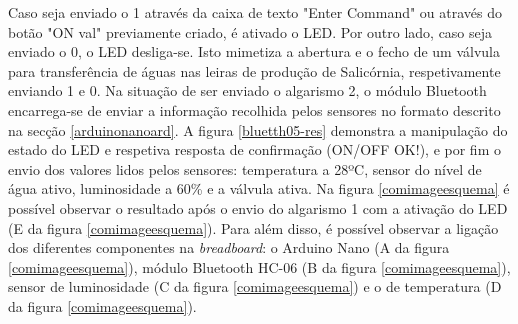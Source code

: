 Caso seja enviado o 1 através da caixa de texto "Enter Command" ou através do botão "ON val" previamente criado, é ativado o LED. Por outro lado, caso seja enviado o 0,  o LED desliga-se. Isto mimetiza a abertura e o fecho de um válvula para transferência de águas nas leiras de produção de Salicórnia, respetivamente enviando 1 e 0. Na situação de ser enviado o algarismo 2, o módulo Bluetooth encarrega-se de enviar a informação recolhida pelos sensores no formato descrito na secção \ref{arduinonanoard}. A figura \ref{bluetth05-res} demonstra a manipulação do estado do LED e respetiva resposta de confirmação (ON/OFF OK!), e por fim o envio dos valores lidos pelos sensores: temperatura a 28ºC, sensor do nível de água ativo, luminosidade a 60\% e a válvula ativa. Na figura \ref{comimageesquema} é possível observar o resultado após o envio do algarismo 1 com a ativação do \ac{LED} (E da figura \ref{comimageesquema}). Para além disso, é possível observar a ligação dos diferentes componentes na \textit{breadboard}: o Arduino Nano (A da figura \ref{comimageesquema}), módulo Bluetooth HC-06 (B da figura \ref{comimageesquema}), sensor de luminosidade (C da figura \ref{comimageesquema}) e o de temperatura (D da figura \ref{comimageesquema}). 





